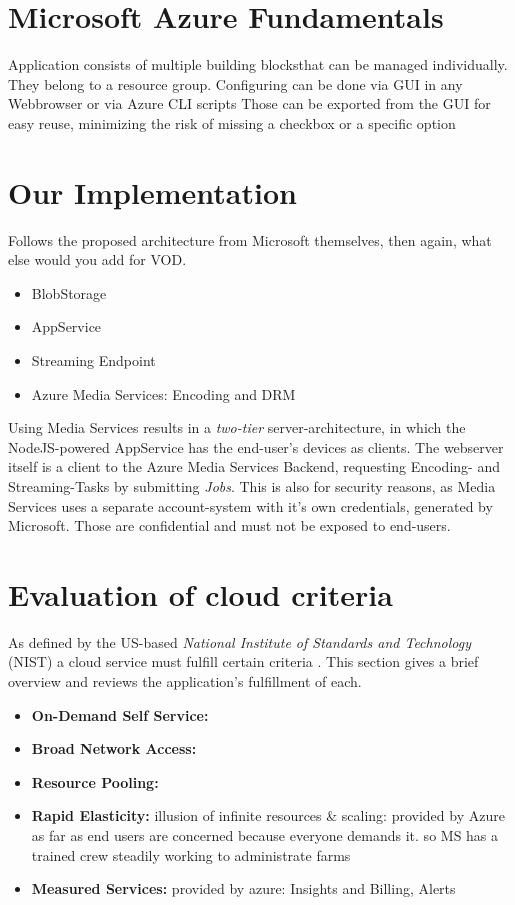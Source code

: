 \documentclass[english]{lni}
\begin{document}
\section{Microsoft Azure Fundamentals}
Application consists of multiple \glqq building blocks\grqq that can be managed individually.
They belong to a resource group.
Configuring can be done via GUI in any Webbrowser or via Azure CLI scripts
Those can be exported from the GUI for easy reuse, minimizing the risk of missing a checkbox or a specific option

\section{Our Implementation}
Follows the proposed architecture from Microsoft themselves, then again, what else would you add for VOD.
\begin{itemize}
    \item BlobStorage
    \item AppService
    \item Streaming Endpoint
    \item Azure Media Services: Encoding and DRM
\end{itemize}

Using Media Services results in a \textit{two-tier} server-architecture, in which the NodeJS-powered AppService has the end-user's devices
as clients. The webserver itself is a client to the Azure Media Services Backend, requesting Encoding- and Streaming-Tasks by
submitting \textit{Jobs}. This is also for security reasons, as Media Services uses a separate account-system with it's own credentials, 
generated by Microsoft.
Those are confidential and must not be exposed to end-users.

\section{Evaluation of cloud criteria}
As defined by the US-based \textit{National Institute of Standards and Technology} (NIST) a cloud service must fulfill
certain criteria \cite{nistCloud}. This section gives a brief overview and reviews the application's fulfillment of each.
\begin{itemize}
    \item \textbf{On-Demand Self Service:}
    \item \textbf{Broad Network Access:}
    \item \textbf{Resource Pooling:}
    \item \textbf{Rapid Elasticity:} illusion of infinite resources \& scaling: provided by Azure as far as end users are concerned because everyone demands it. so MS has a trained 
    crew steadily working to administrate farms
    \item \textbf{Measured Services:} provided by azure: Insights and Billing, Alerts
\end{itemize}
\end{document}
